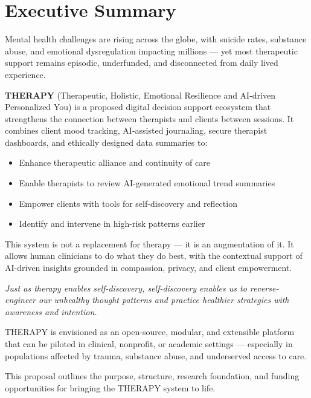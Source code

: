 \section*{Executive Summary}

Mental health challenges are rising across the globe, with suicide rates, substance abuse, and emotional dysregulation impacting millions — yet most therapeutic support remains episodic, underfunded, and disconnected from daily lived experience.

\textbf{THERAPY} (Therapeutic, Holistic, Emotional Resilience and AI-driven Personalized You) is a proposed digital decision support ecosystem that strengthens the connection between therapists and clients between sessions. It combines client mood tracking, AI-assisted journaling, secure therapist dashboards, and ethically designed data summaries to:

\begin{itemize}
  \item Enhance therapeutic alliance and continuity of care
  \item Enable therapists to review AI-generated emotional trend summaries
  \item Empower clients with tools for self-discovery and reflection
  \item Identify and intervene in high-risk patterns earlier
\end{itemize}

This system is not a replacement for therapy — it is an augmentation of it. It allows human clinicians to do what they do best, with the contextual support of AI-driven insights grounded in compassion, privacy, and client empowerment.

\bigskip
\noindent\textit{
Just as therapy enables self-discovery, self-discovery enables us to reverse-engineer our unhealthy thought patterns and practice healthier strategies with awareness and intention.
}

\bigskip
THERAPY is envisioned as an open-source, modular, and extensible platform that can be piloted in clinical, nonprofit, or academic settings — especially in populations affected by trauma, substance abuse, and underserved access to care.

\bigskip
This proposal outlines the purpose, structure, research foundation, and funding opportunities for bringing the THERAPY system to life.
